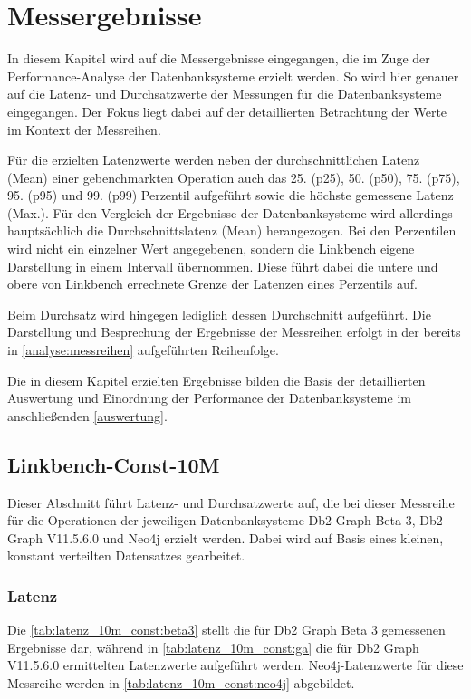 \chapter{Messergebnisse}
\label{ergebnisse}

In diesem Kapitel wird auf die Messergebnisse eingegangen, die im Zuge der Per\-for\-mance-Analyse der Datenbanksysteme erzielt werden. So wird hier genauer auf die Latenz- und Durchsatzwerte der Messungen für die Datenbanksysteme eingegangen. Der Fokus liegt dabei auf der detaillierten Betrachtung der Werte im Kontext der Messreihen. 

Für die erzielten Latenzwerte werden neben der durchschnittlichen Latenz (Mean) einer gebenchmarkten Operation auch das 25. (p25), 50. (p50), 75. (p75), 95. (p95) und 99. (p99) Perzentil aufgeführt sowie die höchste gemessene Latenz (Max.). Für den Vergleich der Ergebnisse der Datenbanksysteme wird allerdings hauptsächlich die Durchschnittslatenz (Mean) herangezogen. Bei den Perzentilen wird nicht ein einzelner Wert angegebenen, sondern die Linkbench eigene Darstellung in einem Intervall übernommen. Diese führt dabei die untere und obere von Linkbench errechnete Grenze der Latenzen eines Perzentils auf.

Beim Durchsatz wird hingegen lediglich dessen Durchschnitt aufgeführt. Die Darstellung und Besprechung der Ergebnisse der Messreihen erfolgt in der bereits in \autoref{analyse:messreihen} aufgeführten Reihenfolge. 

Die in diesem Kapitel erzielten Ergebnisse bilden die Basis der detaillierten Auswertung und Einordnung der Performance der Datenbanksysteme im anschließenden \autoref{auswertung}.

\section{Linkbench-Const-10M}
\label{ergebnisse:10m_const}
Dieser Abschnitt führt Latenz- und Durchsatzwerte auf, die bei dieser Messreihe für die Operationen der jeweiligen Datenbanksysteme Db2 Graph Beta 3, Db2 Graph V11.5.6.0 und Neo4j erzielt werden. Dabei wird auf Basis eines kleinen, konstant verteilten Datensatzes gearbeitet.

\subsection{Latenz}

Die \autoref{tab:latenz_10m_const:beta3} stellt die für Db2 Graph Beta 3 gemessenen Ergebnisse dar, während in \autoref{tab:latenz_10m_const:ga} die für Db2 Graph V11.5.6.0 ermittelten Latenzwerte aufgeführt werden. Neo4j-Latenzwerte für diese Messreihe werden in \autoref{tab:latenz_10m_const:neo4j} abgebildet.


